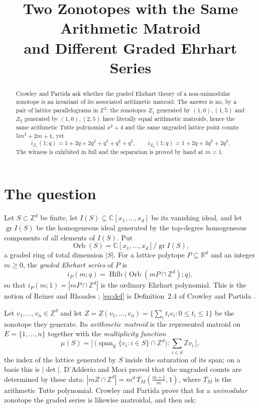 \documentclass[11pt]{amsart}
\title[Equal arithmetic matroid, different graded Ehrhart series]
{Two Zonotopes with the Same Arithmetic Matroid\\ and Different Graded Ehrhart Series}
\date{}
\theoremstyle{definition}
\newcommand{\Z}{\mathbb Z}
\newcommand{\R}{\mathbb R}
\newcommand{\C}{\mathbb C}
\newcommand{\Orb}{\operatorname{Orb}}
\newcommand{\Hilb}{\operatorname{Hilb}}
\newcommand{\grI}{\operatorname{gr}}
\newcommand{\Zone}{Z_1}
\newcommand{\Ztwo}{Z_2}
\begin{document}
\begin{abstract}
Crowley and Partida ask whether the graded Ehrhart theory of a non-unimodular zonotope is an
invariant of its associated arithmetic matroid. The answer is no, by a pair of lattice
parallelograms in $\Z^2$: the zonotopes $\Zone$ generated by $(1,0),(1,5)$ and $\Ztwo$ generated
by $(1,0),(2,5)$ have literally equal arithmetic matroids, hence the same arithmetic Tutte
polynomial $x^2+4$ and the same ungraded lattice point counts $5m^2+2m+1$, yet
\[
 i_{\Zone}(1;q)=1+2q+2q^2+q^3+q^4+q^5,
 \qquad
 i_{\Ztwo}(1;q)=1+2q+3q^2+2q^3 .
\]
The witness is exhibited in full and the separation is proved by hand at $m=1$.
\end{abstract}

\maketitle

\section{The question}

Let $S\subset\Z^d$ be finite, let $I(S)\subseteq\C[x_1,\dots,x_d]$ be its vanishing ideal, and
let $\grI I(S)$ be the homogeneous ideal generated by the top-degree homogeneous components of
all elements of $I(S)$. Put
\[
 \Orb(S)=\C[x_1,\dots,x_d]/\grI I(S),
\]
a graded ring of total dimension $|S|$. For a lattice polytope $P\subseteq\R^d$ and an integer
$m\ge0$, the \emph{graded Ehrhart series} of $P$ is
\begin{equation}\label{eq:def}
 i_P(m;q)=\Hilb\bigl(\Orb(mP\cap\Z^d);q\bigr),
\end{equation}
so that $i_P(m;1)=|mP\cap\Z^d|$ is the ordinary Ehrhart polynomial. This is the notion of Reiner
and Rhoades \cite{RR}; \eqref{eq:def} is Definition~2.4 of Crowley and Partida \cite{CP}.

Let $v_1,\dots,v_n\in\Z^d$ and let $Z=Z(v_1,\dots,v_n)=\{\sum_it_iv_i:0\le t_i\le1\}$ be the
zonotope they generate. Its \emph{arithmetic matroid} is the represented matroid on
$E=\{1,\dots,n\}$ together with the \emph{multiplicity function}
\begin{equation}\label{eq:mult}
 \mu(S)=\bigl[\,\bigl(\operatorname{span}_\R\{v_i:i\in S\}\cap\Z^d\bigr):\textstyle\sum_{i\in S}\Z v_i\,\bigr],
\end{equation}
the index of the lattice generated by $S$ inside the saturation of its span; on a basis this is
$|\det|$. D'Adderio and Moci \cite{DM} proved that the ungraded counts are determined by these
data: $|mZ\cap\Z^d|=m^{d}\,T_M\!\left(\frac{m+1}{m},1\right)$, where $T_M$ is the arithmetic
Tutte polynomial. Crowley and Partida prove that for a \emph{unimodular} zonotope the graded
series is likewise matroidal, and then ask:
\end{document}
